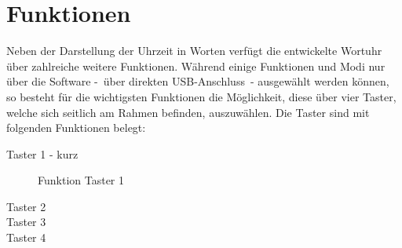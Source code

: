 
\section{Funktionen}
\label{sec:Funktionen}


Neben der Darstellung der Uhrzeit in Worten verfügt die entwickelte Wortuhr über zahlreiche weitere Funktionen. Während einige Funktionen und Modi nur über die Software -~über direkten USB-Anschluss~- ausgewählt werden können, so besteht für die wichtigsten Funktionen die Möglichkeit, diese über vier Taster, welche sich seitlich am Rahmen befinden, auszuwählen. Die Taster sind mit folgenden Funktionen belegt:

\begin{description}

\item[Taster 1 - kurz] Funktion Taster 1
\item[Taster 2]
\item[Taster 3]
\item[Taster 4]


\end {description}